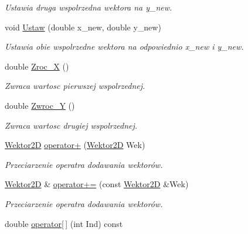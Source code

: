 \begin{DoxyCompactItemize}
\begin{DoxyCompactList}\small\item\em Ustawia druga wspolrzedna wektora na y\+\_\+new. \end{DoxyCompactList}\item 
\hypertarget{class_wektor2_d_a33026b3a205d6e3f66c25c2e6e241a71}{void \hyperlink{class_wektor2_d_a33026b3a205d6e3f66c25c2e6e241a71}{Ustaw} (double x\+\_\+new, double y\+\_\+new)}\label{class_wektor2_d_a33026b3a205d6e3f66c25c2e6e241a71}

\begin{DoxyCompactList}\small\item\em Ustawia obie wspolrzedne wektora na odpowiednio x\+\_\+new i y\+\_\+new. \end{DoxyCompactList}\item 
\hypertarget{class_wektor2_d_aa52f09def60840859082e2c8728928f7}{double \hyperlink{class_wektor2_d_aa52f09def60840859082e2c8728928f7}{Zroc\+\_\+\+X} ()}\label{class_wektor2_d_aa52f09def60840859082e2c8728928f7}

\begin{DoxyCompactList}\small\item\em Zwraca wartosc pierwszej wspolrzednej. \end{DoxyCompactList}\item 
\hypertarget{class_wektor2_d_ad87d085bf5865039317476080b3cda69}{double \hyperlink{class_wektor2_d_ad87d085bf5865039317476080b3cda69}{Zwroc\+\_\+\+Y} ()}\label{class_wektor2_d_ad87d085bf5865039317476080b3cda69}

\begin{DoxyCompactList}\small\item\em Zwraca wartosc drugiej wspolrzednej. \end{DoxyCompactList}\item 
\hyperlink{class_wektor2_d}{Wektor2\+D} \hyperlink{class_wektor2_d_af452ceb01296d1b2a00104ef169b5380}{operator+} (\hyperlink{class_wektor2_d}{Wektor2\+D} Wek)
\begin{DoxyCompactList}\small\item\em Przeciarzenie operatra dodawania wektorów. \end{DoxyCompactList}\item 
\hyperlink{class_wektor2_d}{Wektor2\+D} \& \hyperlink{class_wektor2_d_a839baa1a65b81fa76457323f1142ba81}{operator+=} (const \hyperlink{class_wektor2_d}{Wektor2\+D} \&Wek)
\begin{DoxyCompactList}\small\item\em Przeciarzenie operatra dodawania wektorów. \end{DoxyCompactList}\item 
\hypertarget{class_wektor2_d_ad02b05aa715c7c5f52b11a45af33a725}{double \hyperlink{class_wektor2_d_ad02b05aa715c7c5f52b11a45af33a725}{operator\mbox{[}$\,$\mbox{]}} (int Ind) const }\label{class_wektor2_d_ad02b05aa715c7c5f52b11a45af33a725}


\end{DoxyCompactItemize}
